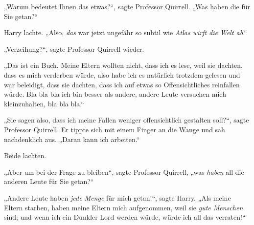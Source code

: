 „Warum bedeutet Ihnen das etwas?“, sagte Professor Quirrell. „Was haben die für Sie getan?“

Harry lachte. „Also, \emph{das} war jetzt ungefähr so subtil wie \emph{Atlas wirft die Welt ab}.“%

„Verzeihung?“, sagte Professor Quirrell wieder.

„Das ist ein Buch. Meine Eltern wollten nicht, dass ich es lese, weil sie dachten, dass es mich verderben würde, also habe ich es natürlich trotzdem gelesen und war beleidigt, dass sie dachten, dass ich auf etwas so Offensichtliches reinfallen würde. Bla bla bla ich bin besser als andere, andere Leute versuchen mich kleinzuhalten, bla bla bla.“

„Sie sagen also, dass ich meine Fallen weniger offensichtlich gestalten soll?“, sagte Professor Quirrell. Er tippte sich mit einem Finger an die Wange und sah nachdenklich aus. „Daran kann ich arbeiten.“

Beide lachten.

„Aber um bei der Frage zu bleiben“, sagte Professor Quirrell, „was \emph{haben} all die anderen Leute für Sie getan?“

„Andere Leute haben \emph{jede Menge} für mich getan!“, sagte Harry. „Als meine Eltern starben, haben meine Eltern mich aufgenommen, weil sie \emph{gute Menschen} sind; und wenn ich ein Dunkler Lord werden würde, würde ich all das verraten!“

